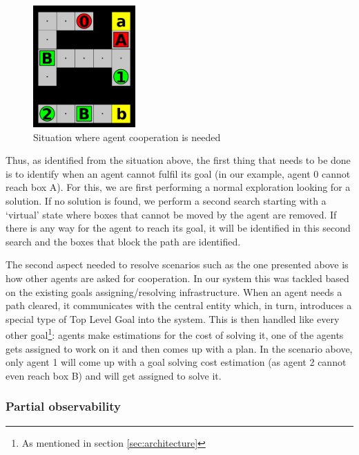 \begin{figure}[htb]
\begin{center}
 \includegraphics[width=0.35\textwidth]{figures/cooperation.png}
 \caption{Situation where agent cooperation is needed}
 \label{fig:cooperation}
\end{center}
\end{figure}

Thus, as identified from the situation above, the first thing that needs to be done is to identify when an
agent cannot fulfil its goal (in our example, agent 0 cannot reach box A). For this, we are first performing a
normal exploration looking for a solution. If no solution is found, we perform a second search starting with a
‘virtual’ state where boxes that cannot be moved by the agent are removed. If there is any way for the agent
to reach its goal, it will be identified in this second search and the boxes that block the path are
identified.

The second aspect needed to resolve scenarios such as the one presented above is how other agents are asked
for cooperation. In our system this was tackled based on the existing goals assigning/resolving
infrastructure. When an agent needs a path cleared, it communicates with the central entity which, in turn,
introduces a special type of Top Level Goal into the system. This is then handled like every other
goal\footnote{As mentioned in section \ref{sec:architecture}}: agents make estimations for the cost of solving
it, one of the agents gets assigned to work on it and then comes up with a plan. In the scenario above, only
agent 1 will come up with a goal solving cost estimation (as agent 2 cannot even reach box B) and will get
assigned to solve it.

\subsubsection{Partial observability}

